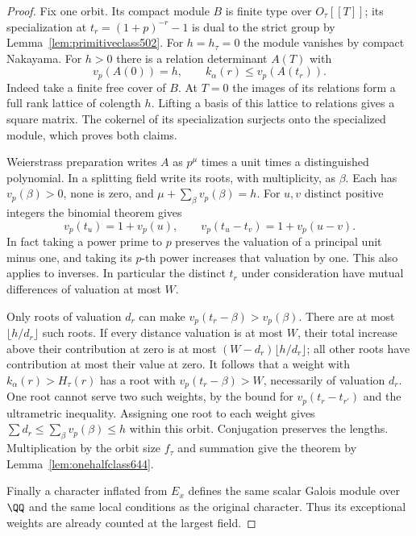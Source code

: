 \documentclass[a4paper,11pt]{article}
\theoremstyle{definition}
\theoremstyle{remark}
\numberwithin{equation}{section}
\begin{document}
\begin{proof}
Fix one orbit. Its compact module \(B\) is finite type over
\(O_\tau[[T]]\); its specialization at \(t_r=(1+p)^{-r}-1\)
is dual to the strict group by Lemma~\ref{lem:primitiveclass502}.
For \(h=h_\tau=0\) the module vanishes by compact Nakayama.
For \(h>0\) there is a relation determinant \(A(T)\) with
\[
 v_p(A(0))=h,\qquad k_\alpha(r)\le v_p(A(t_r)).
\]
Indeed take a finite free cover of \(B\). At \(T=0\) the
images of its relations form a full rank lattice of colength
\(h\). Lifting a basis of this lattice to relations gives a
square matrix. The cokernel of its specialization surjects
onto the specialized module, which proves both claims.

Weierstrass preparation writes \(A\) as \(p^\mu\) times a
unit times a distinguished polynomial. In a splitting field
write its roots, with multiplicity, as \(\beta\).
Each has \(v_p(\beta)>0\), none is zero, and
\(\mu+\sum_\beta v_p(\beta)=h\). For \(u,v\) distinct positive
integers the binomial theorem gives
\[
 v_p(t_u)=1+v_p(u),\qquad
 v_p(t_u-t_v)=1+v_p(u-v).
\]
In fact taking a power prime to \(p\) preserves the valuation
of a principal unit minus one, and taking its \(p\)-th power
increases that valuation by one. This also applies to inverses.
In particular the distinct \(t_r\) under consideration have
mutual differences of valuation at most \(W\).

Only roots of valuation \(d_r\) can make
\(v_p(t_r-\beta)>v_p(\beta)\). There are at most
\(\lfloor h/d_r\rfloor\) such roots. If every distance valuation
is at most \(W\), their total increase above their contribution
at zero is at most \((W-d_r)\lfloor h/d_r\rfloor\); all other
roots have contribution at most their value at zero. It follows
that a weight with \(k_\alpha(r)>H_\tau(r)\) has a root with
\(v_p(t_r-\beta)>W\), necessarily of valuation \(d_r\).
One root cannot serve two such weights, by the bound for
\(v_p(t_r-t_{r'})\) and the ultrametric inequality. Assigning
one root to each weight gives \(\sum d_r\le\sum_\beta v_p(\beta)
\le h\) within this orbit. Conjugation preserves the lengths.
Multiplication by the orbit size \(f_\tau\) and summation give
the theorem by Lemma~\ref{lem:onehalfclass644}.

Finally a character inflated from \(E_x\) defines the same
scalar Galois module over \(\QQ\) and the same local conditions
as the original character. Thus its exceptional weights are
already counted at the largest field.
\end{proof}
\end{document}
